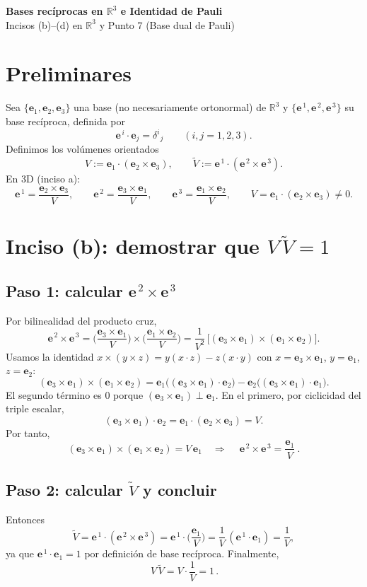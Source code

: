 \documentclass[12pt]{article}
\newcommand{\e}{\mathbf e}   %
\begin{document}
\begin{center}
\Large\textbf{Bases recíprocas en $\mathbb{R}^3$ e Identidad de Pauli}\\[4pt]
\large Incisos (b)--(d) en $\mathbb{R}^3$ y Punto 7 (Base dual de Pauli)
\end{center}
\bigskip

\section*{Preliminares}
Sea $\{\e_1,\e_2,\e_3\}$ una base (no necesariamente ortonormal) de $\mathbb R^3$ y 
$\{\e^{\,1},\e^{\,2},\e^{\,3}\}$ su base recíproca, definida por
\[
\e^{\,i}\!\cdot \e_j=\delta^{i}{}_{j}\qquad (i,j=1,2,3).
\]
Definimos los volúmenes orientados
\[
V:=\e_1\!\cdot(\e_2\times \e_3), 
\qquad 
\tilde V:=\e^{\,1}\!\cdot(\e^{\,2}\times \e^{\,3}).
\]
En 3D (inciso a):
\[
\e^{\,1}=\frac{\e_2\times \e_3}{V},\qquad
\e^{\,2}=\frac{\e_3\times \e_1}{V},\qquad
\e^{\,3}=\frac{\e_1\times \e_2}{V},\qquad
V=\e_1\!\cdot(\e_2\times \e_3)\neq 0.
\]

\section*{Inciso (b): demostrar que $V\,\tilde V=1$}

\subsection*{Paso 1: calcular $\e^{\,2}\times \e^{\,3}$}
Por bilinealidad del producto cruz,
\[
\e^{\,2}\times \e^{\,3}
=\Big(\frac{\e_3\times \e_1}{V}\Big)\times
 \Big(\frac{\e_1\times \e_2}{V}\Big)
=\frac{1}{V^2}\,\big[(\e_3\times \e_1)\times (\e_1\times \e_2)\big].
\]
Usamos la identidad $x\times(y\times z)=y(x\!\cdot z)-z(x\!\cdot y)$ con 
$x=\e_3\times \e_1$, $y=\e_1$, $z=\e_2$:
\[
(\e_3\times \e_1)\times (\e_1\times \e_2)
= \e_1\big((\e_3\times \e_1)\!\cdot \e_2\big)
     - \e_2\big((\e_3\times \e_1)\!\cdot \e_1\big).
\]
El segundo término es $0$ porque $(\e_3\times \e_1)\perp \e_1$. 
En el primero, por ciclicidad del triple escalar,
\[
(\e_3\times \e_1)\!\cdot \e_2
= \e_1\!\cdot(\e_2\times \e_3)=V.
\]
Por tanto,
\[
(\e_3\times \e_1)\times (\e_1\times \e_2)=V\,\e_1
\quad\Rightarrow\quad
\boxed{\ \e^{\,2}\times \e^{\,3}=\dfrac{\e_1}{V}\ }.
\]

\subsection*{Paso 2: calcular $\tilde V$ y concluir}
Entonces
\[
\tilde V
= \e^{\,1}\!\cdot(\e^{\,2}\times \e^{\,3})
= \e^{\,1}\!\cdot\Big(\frac{\e_1}{V}\Big)
= \frac{1}{V}\,(\e^{\,1}\!\cdot \e_1)
= \frac{1}{V},
\]
ya que $\e^{\,1}\!\cdot \e_1=1$ por definición de base recíproca. 
Finalmente,
\[
\boxed{\,V\,\tilde V=V\cdot \frac{1}{V}=1\,}.
\]
\end{document}
